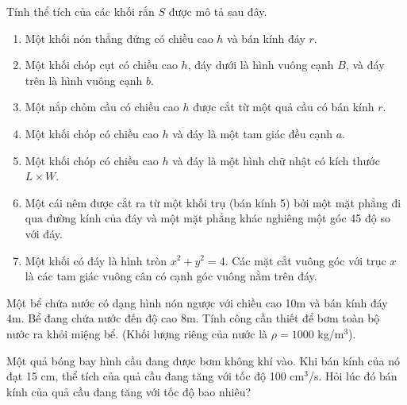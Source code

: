 \begin{exercise}
    Tính thể tích của các khối rắn $S$ được mô tả sau đây.
    \begin{enumerate}[label=(\alph*)]
        \item Một khối nón thẳng đứng có chiều cao $h$ và bán kính đáy $r$.
        \item Một khối chóp cụt có chiều cao $h$, đáy dưới là hình vuông cạnh $B$, và đáy trên là hình vuông cạnh $b$.
        \item Một nắp chỏm cầu có chiều cao $h$ được cắt từ một quả cầu có bán kính $r$.
        \item Một khối chóp có chiều cao $h$ và đáy là một tam giác đều cạnh $a$.
        \item Một khối chóp có chiều cao $h$ và đáy là một hình chữ nhật có kích thước $L \times W$.
        \item Một cái nêm được cắt ra từ một khối trụ (bán kính 5) bởi một mặt phẳng đi qua đường kính của đáy và một mặt phẳng khác nghiêng một góc 45 độ so với đáy.
        \item Một khối có đáy là hình tròn $x^2+y^2=4$. Các mặt cắt vuông góc với trục $x$ là các tam giác vuông cân có cạnh góc vuông nằm trên đáy.
    \end{enumerate}
\end{exercise}

\begin{exercise}
    Một bể chứa nước có dạng hình nón ngược với chiều cao 10m và bán kính đáy 4m. Bể đang chứa nước đến độ cao 8m. Tính công cần thiết để bơm toàn bộ nước ra khỏi miệng bể. (Khối lượng riêng của nước là $\rho = 1000$ kg/m$^3$).
\end{exercise}

\begin{exercise}
    Một quả bóng bay hình cầu đang được bơm không khí vào. Khi bán kính của nó đạt 15 cm, thể tích của quả cầu đang tăng với tốc độ 100 cm$^3$/s. Hỏi lúc đó bán kính của quả cầu đang tăng với tốc độ bao nhiêu?
\end{exercise}

